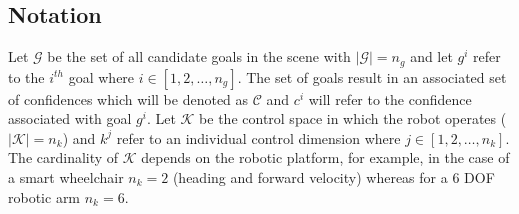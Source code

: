 \documentclass[conference]{IEEEtran}
\begin{document}
\subsection{Notation}


Let $\mathcal{G}$ be the set of all candidate goals in the scene with $\vert\mathcal{G}\vert = n_g$ and let $g^{i}$ refer to the $i^{th}$ goal where $i \in [1,2,\dots,n_g]$. The set of goals result in an associated set of confidences which will be denoted as $\mathcal{C}$ and $c^{i}$ will refer to the confidence associated with goal $g^{i}$. Let $\mathcal{K}$ be the control space in which the robot operates ($\vert\mathcal{K}\vert = n_k$) and $k^{j}$ refer to an individual control dimension where $j \in [1,2,\dots,n_k]$.  The cardinality of $\mathcal{K}$ depends on the robotic platform, for example, in the case of a smart wheelchair $n_k = 2$ (heading and forward velocity) whereas for a 6 DOF robotic arm $n_k = 6$.
\end{document}
